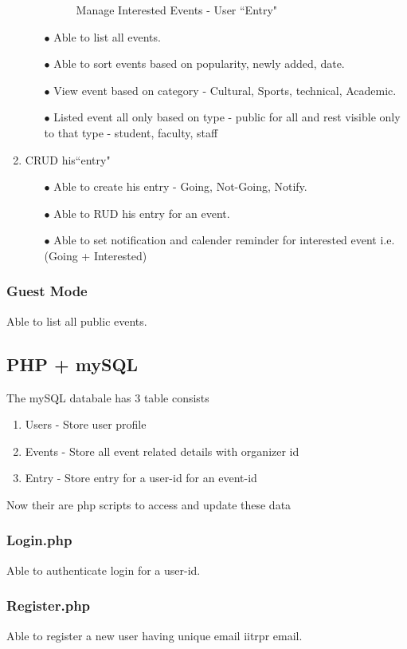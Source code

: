\documentclass{article}
\begin{document}
\begin{enumerate}
\begin{itemize}
\begin{figure}[h]
    \caption{Manage Interested Events - User ``Entry"}
\end{figure}
\item[$\bullet$] Able to list all events.
\item[$\bullet$] Able to sort events based on popularity, newly added, date.
\item[$\bullet$] View event based on category - Cultural, Sports, technical, Academic.
\item[$\bullet$] Listed event all only based on type - public for all and rest visible only to that type -  student, faculty, staff
\end{itemize}

\item{CRUD his``entry"}

\begin{itemize}
\item[$\bullet$] Able to create his entry - Going, Not-Going, Notify.
\item[$\bullet$] Able to RUD his entry for an event.
\item[$\bullet$] Able to set notification and calender reminder for interested event i.e. (Going + Interested)
\end{itemize}
\end{enumerate}
\subsubsection{Guest Mode}
Able to list all public events.
\clearpage
\subsection{PHP + mySQL}
The mySQL databale has 3 table consists 
\begin{enumerate}
\item{Users - Store user profile} 
\item{Events - Store all event related details with organizer id}
\item{Entry - Store entry for a user-id for an event-id} 
\end{enumerate}
Now their are php scripts to access and update these data
\subsubsection{Login.php}
Able to authenticate login for a user-id.
\subsubsection{Register.php}
Able to register a new user having unique email iitrpr email.
\end{document}
